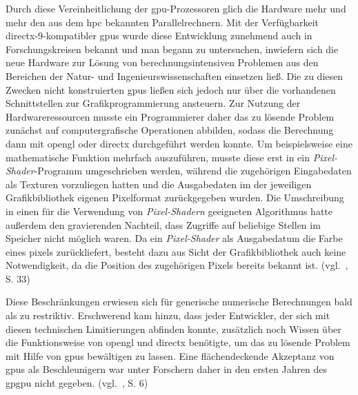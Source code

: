 Durch diese Vereinheitlichung der \gls{gpu}-Prozessoren glich die Hardware mehr und mehr den aus dem \gls{hpc} bekannten
Parallelrechnern. Mit der Verfügbarkeit \gls{directx}-9-kompatibler \gls{gpu}s wurde diese Entwicklung zunehmend
auch in Forschungskreisen bekannt und man begann zu untersuchen, inwiefern sich die neue Hardware zur Lösung von
berechnungsintensiven Problemen aus den Bereichen der Natur- und Ingenieurswissenschaften einsetzen ließ. Die zu diesen
Zwecken nicht konstruierten \gls{gpu}s ließen sich jedoch nur über die vorhandenen Schnittstellen zur
Grafikprogrammierung ansteuern. Zur Nutzung der Hardwareressourcen musste ein Programmierer daher das zu lösende Problem
zunächst auf computergrafische Operationen abbilden, sodass die Berechnung dann mit \gls{opengl} oder \gls{directx}
durchgeführt werden konnte. Um beispielsweise eine mathematische Funktion mehrfach auszuführen, musste diese erst in
ein \textit{Pixel-Shader}-Programm umgeschrieben werden, während die zugehörigen Eingabedaten als Texturen
vorzuliegen hatten und die Ausgabedaten im der jeweiligen Grafikbibliothek eigenen Pixelformat zurückgegeben wurden.
Die Umschreibung in einen für die Verwendung von \textit{Pixel-Shadern} geeigneten Algorithmus hatte außerdem den
gravierenden Nachteil, dass Zugriffe auf beliebige Stellen im Speicher nicht möglich waren. Da ein \textit{Pixel-Shader}
als Ausgabedatum die Farbe eines \gls{pixel}s zurückliefert, besteht dazu aus Sicht der Grafikbibliothek auch keine
Notwendigkeit, da die Position des zugehörigen Pixels bereits bekannt ist. (vgl.~\cite{kirkhwu}, S. 33)

Diese Beschränkungen erwiesen sich für generische numerische Berechnungen bald als zu restriktiv. Erschwerend kam hinzu, 
dass jeder Entwickler, der sich mit diesen technischen Limitierungen abfinden konnte, zusätzlich noch Wissen über die
Funktionsweise von \gls{opengl} und \gls{directx} benötigte, um das zu lösende Problem mit Hilfe von \gls{gpu}s
bewältigen zu lassen. Eine flächendeckende Akzeptanz von \gls{gpu}s als Beschleunigern war unter Forschern daher in den
ersten Jahren des \gls{gpgpu} nicht gegeben. (vgl.~\cite{sandkand}, S. 6)

